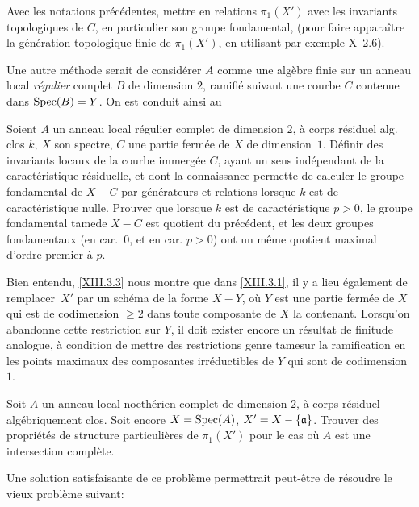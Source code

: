 \begin{probleme} \label{XIII.3.2}
Avec les notations pr\'ec\'edentes, mettre en relations $\pi_1(X')$ avec les invariants topologiques de $C$, en particulier son groupe fondamental, (pour faire appara\^itre la g\'en\'eration topologique finie de $\pi_1(X')$, en utilisant par exemple \SGA \textup{X~2.6}).
\end{probleme}

Une autre m\'ethode serait de consid\'erer $A$ comme une alg\`ebre finie sur un anneau local \emph{régulier} complet $B$ de dimension $2$, ramifi\'e suivant une courbe $C$ contenue dans $\operatorname{Spec}(B)=Y$. On est conduit ainsi au

\begin{probleme} \label{XIII.3.3}
Soient $A$ un anneau local r\'egulier complet de dimension $2$, \`a corps r\'esiduel alg. clos $k$, $X$ son spectre, $C$ une partie ferm\'ee de $X$ de dimension~$1$. D\'efinir des invariants locaux de la courbe immerg\'ee $C$, ayant un sens ind\'ependant de la caract\'eristique r\'esiduelle, et dont la connaissance permette de calculer le groupe fondamental de $X-C$ par g\'en\'erateurs et relations lorsque $k$ est de caract\'eristique nulle. Prouver que lorsque $k$ est de caract\'eristique $p> 0$, le groupe fondamental \og tame\fg de $X-C$ est quotient du pr\'ec\'edent, et les deux groupes fondamentaux (en car.~$0$, et en car. $p> 0$) ont un m\^eme quotient maximal d'ordre premier \`a $p$.
\end{probleme}

Bien entendu, \ref{XIII.3.3} nous montre que dans \ref{XIII.3.1}, il y a lieu \'egalement de remplacer~$X'$ par un sch\'ema de la forme $X-Y$, o\`u $Y$ est une partie ferm\'ee de $X$ qui est de codimension $\ge 2$ dans toute composante de $X$ la contenant. Lorsqu'on abandonne cette restriction sur $Y$, il doit exister encore un r\'esultat de finitude analogue, \`a condition de mettre des restrictions genre \og tame\fg sur la ramification en les points maximaux des composantes irr\'eductibles de $Y$ qui sont de codimension $1$.

\begin{probleme} \label{XIII.3.4}
Soit $A$ un anneau local noeth\'erien complet de dimension $2$, \`a corps r\'esiduel alg\'ebriquement clos. Soit encore $X=\operatorname{Spec}(A)$, $X'=X-\{\mathfrak{a}\}$. Trouver des propri\'et\'es de structure particuli\`eres de $\pi_1(X')$ pour le cas o\`u $A$ est une intersection compl\`ete.
\end{probleme}

Une solution satisfaisante de ce probl\`eme permettrait peut-\^etre de r\'esoudre le vieux probl\`eme suivant:

